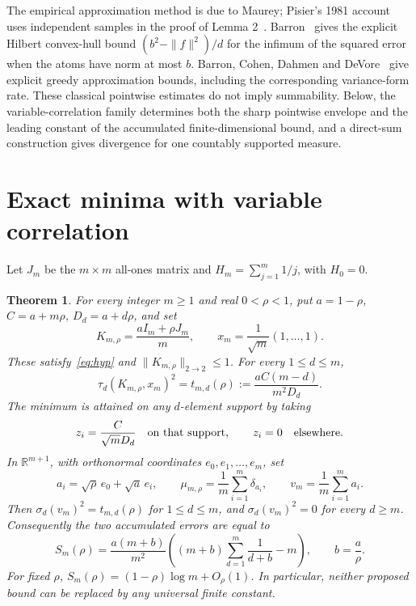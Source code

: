 \documentclass[11pt]{article}
\newtheorem{theorem}{Theorem}
\newcommand{\R}{\mathbb R}
\begin{document}
The empirical approximation method is due to Maurey; Pisier's 1981 account
uses independent samples in the proof of Lemma 2~\cite{pisier}.
Barron~\cite[Lemma 1, p.~934, (13)]{barron1993} gives the explicit
Hilbert convex-hull bound $(b^2-\|f\|^2)/d$ for the infimum of the squared
error when the atoms have norm at most $b$.
Barron, Cohen, Dahmen and DeVore~\cite[Theorems 2.1--2.2, (2.13), (2.19)]{barron}
give explicit greedy approximation bounds, including the corresponding
variance-form rate. These classical pointwise estimates do not imply
summability. Below, the variable-correlation family determines both the
sharp pointwise envelope and the leading constant of the accumulated
finite-dimensional bound, and a direct-sum construction gives divergence
for one countably supported measure.

\section{Exact minima with variable correlation}
Let $J_m$ be the $m\times m$ all-ones matrix and
$H_m=\sum_{j=1}^m1/j$, with $H_0=0$.
\begin{theorem}\label{thm:main}
For every integer $m\geq1$ and real $0<\rho<1$, put
$a=1-\rho$, $C=a+m\rho$, $D_d=a+d\rho$, and set
\[
 K_{m,\rho}=\frac{aI_m+\rho J_m}{m},\qquad
 x_m=\frac1{\sqrt m}(1,\ldots,1).
\]
These satisfy~\eqref{eq:hyp} and $\|K_{m,\rho}\|_{2\to2}\leq1$.
For every $1\leq d\leq m$,
\begin{equation}\label{eq:error}
 \tau_d(K_{m,\rho},x_m)^2=t_{m,d}(\rho):=
 \frac{aC(m-d)}{m^2D_d}.
\end{equation}
The minimum is attained on any $d$-element support by taking
\begin{equation}\label{eq:optimizer}
 z_i=\frac{C}{\sqrt m D_d}
 \quad\hbox{on that support},\qquad z_i=0\quad\hbox{elsewhere}.
\end{equation}
In $\R^{m+1}$, with orthonormal coordinates $e_0,e_1,\ldots,e_m$, set
\[
 a_i=\sqrt\rho\,e_0+\sqrt a\,e_i,\qquad
 \mu_{m,\rho}=\frac1m\sum_{i=1}^m\delta_{a_i},\qquad
 v_m=\frac1m\sum_{i=1}^m a_i.
\]
Then $\sigma_d(v_m)^2=t_{m,d}(\rho)$ for $1\leq d\leq m$, and
$\sigma_d(v_m)^2=0$ for every $d\geq m$.
Consequently the two accumulated errors are equal to
\begin{equation}\label{eq:total}
 S_m(\rho)=\frac{a(m+b)}{m^2}
 \left((m+b)\sum_{d=1}^m\frac1{d+b}-m\right),
 \qquad b=\frac a\rho.
\end{equation}
For fixed $\rho$, $S_m(\rho)=(1-\rho)\log m+O_\rho(1)$.
In particular, neither proposed bound can be replaced by any universal
finite constant.
\end{theorem}
\end{document}
